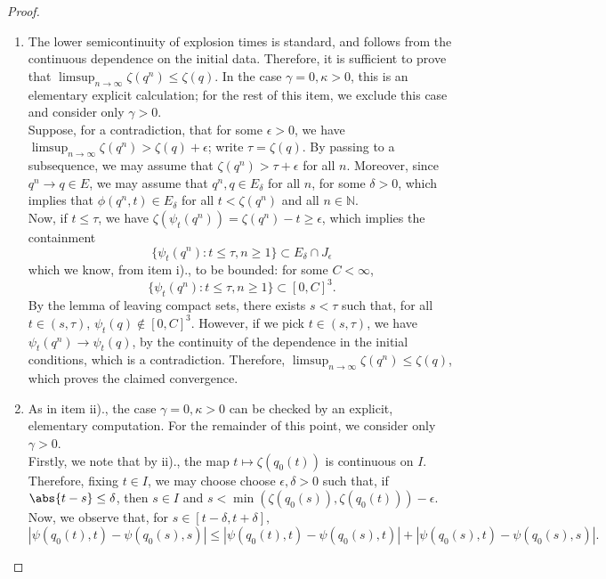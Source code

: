 \begin{proof}
\begin{enumerate}[label=\roman{*}).]
    \item The lower semicontinuity of explosion times is standard, and follows from the continuous dependence on the initial data. Therefore, it is sufficient to prove that $\limsup_{n\rightarrow \infty} \zeta(q^n)\le \zeta(q).$ In the case $\gamma=0, \kappa>0$, this is an elementary explicit calculation; for the rest of this item, we exclude this case and consider only $\gamma>0.$ \medskip \\ Suppose, for a contradiction, that for some $\epsilon>0$, we have $\limsup_{n\rightarrow \infty} \zeta(q^n)>\zeta(q)+\epsilon$; write $\tau=\zeta(q)$. By passing to a subsequence, we may assume that $\zeta(q^n)>\tau+\epsilon$ for all $n$. Moreover, since $q^n\rightarrow q \in E$, we may assume that $q^n, q \in E_\delta$ for all $n$, for some $\delta>0$, which implies that $\phi(q^n,t)\in E_\delta$ for all $t<\zeta(q^n)$ and all $n\in \mathbb{N}$.\medskip\\  Now, if $t\le \tau$, we have $\zeta(\psi_t(q^n))=\zeta(q^n)-t \ge \epsilon$, which implies the containment \begin{equation} \{\psi_t(q^n): t\le \tau, n\ge 1\} \subset E_\delta\cap J_\epsilon \end{equation} which we know, from item i)., to be bounded: for some $C<\infty$, \begin{equation}
        \{\psi_t(q^n): t\le \tau, n\ge 1\} \subset [0,C]^3.
    \end{equation} By the lemma of leaving compact sets, there exists $s<\tau$ such that, for all $t\in (s,\tau)$, $\psi_t(q)\not \in [0,C]^3.$ However, if we pick $t\in (s,\tau)$, we have $\psi_t(q^n) \rightarrow \psi_t(q)$, by the continuity of the dependence in the initial conditions, which is a contradiction. Therefore, $\limsup_{n\rightarrow \infty} \zeta(q^n)\le \zeta(q)$, which proves the claimed convergence.      
    \item As in item ii)., the case $\gamma=0, \kappa>0$ can be checked by an explicit, elementary computation. For the remainder of this point, we consider only $\gamma>0$. \medskip \\ Firstly, we note that by ii)., the map $t\mapsto \zeta(q_0(t))$ is continuous on $I$. Therefore, fixing $t\in I$, we may choose choose  $\epsilon, \delta > 0$ such that, if $\abs{t-s} \le \delta$, then $s\in I$ and $s < \min \left(\zeta\left(q_0(s)\right), \zeta\left(q_0(t)\right)\right)-\epsilon$. Now, we observe that, for $s\in [t-\delta, t+\delta],$\begin{equation}
    |\psi(q_0(t),t)-\psi(q_0(s), s)|\le|\psi(q_0(t),t)-\psi(q_0(s), t)|+|\psi(q_0(s),t)-\psi(q_0(s), s)|.

\end{equation}
\end{enumerate}
\end{proof}
